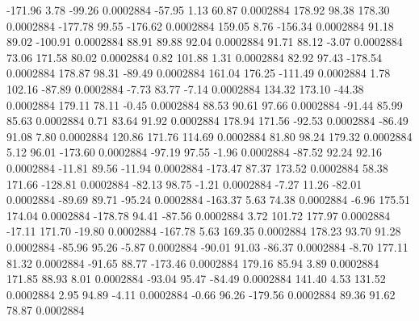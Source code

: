      -171.96        3.78      -99.26     0.0002884
      -57.95        1.13       60.87     0.0002884
      178.92       98.38      178.30     0.0002884
     -177.78       99.55     -176.62     0.0002884
      159.05        8.76     -156.34     0.0002884
       91.18       89.02     -100.91     0.0002884
       88.91       89.88       92.04     0.0002884
       91.71       88.12       -3.07     0.0002884
       73.06      171.58       80.02     0.0002884
        0.82      101.88        1.31     0.0002884
       82.92       97.43     -178.54     0.0002884
      178.87       98.31      -89.49     0.0002884
      161.04      176.25     -111.49     0.0002884
        1.78      102.16      -87.89     0.0002884
       -7.73       83.77       -7.14     0.0002884
      134.32      173.10      -44.38     0.0002884
      179.11       78.11       -0.45     0.0002884
       88.53       90.61       97.66     0.0002884
      -91.44       85.99       85.63     0.0002884
        0.71       83.64       91.92     0.0002884
      178.94      171.56      -92.53     0.0002884
      -86.49       91.08        7.80     0.0002884
      120.86      171.76      114.69     0.0002884
       81.80       98.24      179.32     0.0002884
        5.12       96.01     -173.60     0.0002884
      -97.19       97.55       -1.96     0.0002884
      -87.52       92.24       92.16     0.0002884
      -11.81       89.56      -11.94     0.0002884
     -173.47       87.37      173.52     0.0002884
       58.38      171.66     -128.81     0.0002884
      -82.13       98.75       -1.21     0.0002884
       -7.27       11.26      -82.01     0.0002884
      -89.69       89.71      -95.24     0.0002884
     -163.37        5.63       74.38     0.0002884
       -6.96      175.51      174.04     0.0002884
     -178.78       94.41      -87.56     0.0002884
        3.72      101.72      177.97     0.0002884
      -17.11      171.70      -19.80     0.0002884
     -167.78        5.63      169.35     0.0002884
      178.23       93.70       91.28     0.0002884
      -85.96       95.26       -5.87     0.0002884
      -90.01       91.03      -86.37     0.0002884
       -8.70      177.11       81.32     0.0002884
      -91.65       88.77     -173.46     0.0002884
      179.16       85.94        3.89     0.0002884
      171.85       88.93        8.01     0.0002884
      -93.04       95.47      -84.49     0.0002884
      141.40        4.53      131.52     0.0002884
        2.95       94.89       -4.11     0.0002884
       -0.66       96.26     -179.56     0.0002884
       89.36       91.62       78.87     0.0002884
